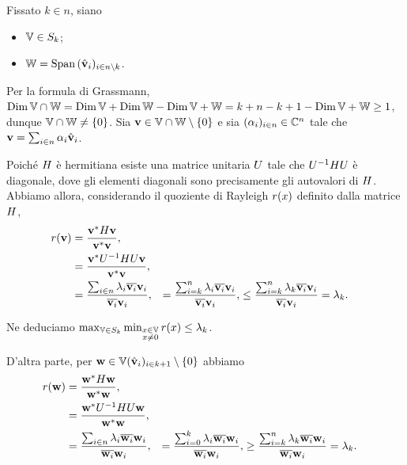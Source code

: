 \par Fissato $k \in n$, siano
\begin{itemize}
	\item $\mathbb{V} \in S_k$;
	\item $\mathbb{W} = \operatorname{\operatorname{Span}}{(\hat{\mathbf{v}}_i)_{i \in n \setminus k}}$.
\end{itemize}
\par Per la formula di Grassmann, $\operatorname{Dim}{\mathbb{V} \cap \mathbb{W}} = \operatorname{Dim}{\mathbb{V}} + \operatorname{Dim}{\mathbb{W}} - \operatorname{Dim}{\mathbb{V} + \mathbb{W}} = k + n - k + 1 - \operatorname{Dim}{\mathbb{V} + \mathbb{W}} \geq 1$, dunque $\mathbb{V} \cap \mathbb{W} \neq \lbrace 0 \rbrace$. Sia $\mathbf{v} \in \mathbb{V} \cap \mathbb{W} \setminus \lbrace 0 \rbrace$ e sia $(\alpha_i)_{i \in n} \in \mathbb{C}^n$ tale che $\mathbf{v} = \sum_{i \in n} \alpha_i \hat{\mathbf{v}}_i$.
\par Poich\'e $H$ \`e hermitiana esiste una matrice unitaria $U$ tale che $U^{-1}HU$ \`e diagonale, dove gli elementi diagonali sono precisamente gli autovalori di $H$. Abbiamo allora, considerando il quoziente di Rayleigh $r(x)$ definito dalla matrice $H$,
\begin{align*}
	r(\mathbf{v})
	&= \frac{{\mathbf{v}}^*H \mathbf{v}}{{\mathbf{v}}^*\mathbf{v}}, \\
	&= \frac{{\mathbf{v}}^*U^{-1}HU \mathbf{v}}{{\mathbf{v}}^*\mathbf{v}}, \\
	&= \frac{\sum_{i \in n} \lambda_i \overline{\mathbf{v}_i}\mathbf{v}_i}{\overline{\mathbf{v}_i}\mathbf{v}_i},
	&= \frac{\sum_{i = k}^n \lambda_i \overline{\mathbf{v}_i}\mathbf{v}_i}{\overline{\mathbf{v}_i}\mathbf{v}_i},
	&\leq \frac{\sum_{i = k}^n \lambda_k \overline{\mathbf{v}_i}\mathbf{v}_i}{\overline{\mathbf{v}_i}\mathbf{v}_i} = \lambda_k.
\end{align*}
\par Ne deduciamo $\max_{\mathbb{V} \in S_k} \min_{\substack{x \in \mathbb{V}\\x \neq 0}} r(x) \leq \lambda_k$.
\par D'altra parte, per $\mathbf{w} \in \mathbb{V}{(\hat{\mathbf{v}}_i)_{i \in k + 1}} \setminus \lbrace 0 \rbrace$ abbiamo
\begin{align*}
	r(\mathbf{w})
	&= \frac{{\mathbf{w}}^*H \mathbf{w}}{{\mathbf{w}}^*\mathbf{w}}, \\
	&= \frac{{\mathbf{w}}^*U^{-1}HU \mathbf{w}}{{\mathbf{w}}^*\mathbf{w}}, \\
	&= \frac{\sum_{i \in n} \lambda_i \overline{\mathbf{w}_i}\mathbf{w}_i}{\overline{\mathbf{w}_i}\mathbf{w}_i},
	&= \frac{\sum_{i = 0}^k \lambda_i \overline{\mathbf{w}_i}\mathbf{w}_i}{\overline{\mathbf{w}_i}\mathbf{w}_i},
	&\geq \frac{\sum_{i = k}^n \lambda_k \overline{\mathbf{w}_i}\mathbf{w}_i}{\overline{\mathbf{w}_i}\mathbf{w}_i} = \lambda_k.
\end{align*}
